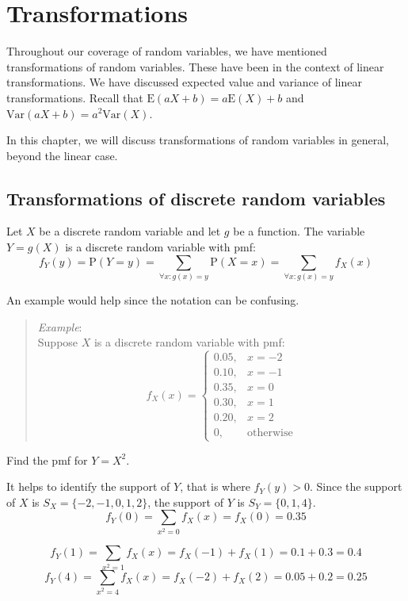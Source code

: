 \documentclass[
  letterpaper,
  DIV=11,
  numbers=noendperiod]{scrreprt}
\begin{document}
\section{Transformations}\label{transformations-1}

Throughout our coverage of random variables, we have mentioned
transformations of random variables. These have been in the context of
linear transformations. We have discussed expected value and variance of
linear transformations. Recall that \(\mbox{E}(aX+b)=a\mbox{E}(X)+b\)
and \(\mbox{Var}(aX+b)=a^2\mbox{Var}(X)\).

In this chapter, we will discuss transformations of random variables in
general, beyond the linear case.

\subsection{Transformations of discrete random
variables}\label{transformations-of-discrete-random-variables}

Let \(X\) be a discrete random variable and let \(g\) be a function. The
variable \(Y=g(X)\) is a discrete random variable with pmf: \[
f_Y(y)=\mbox{P}(Y=y)=\sum_{\forall x: g(x)=y}\mbox{P}(X=x)=\sum_{\forall x: g(x)=y}f_X(x)
\]

An example would help since the notation can be confusing.

\begin{quote}
\emph{Example}:\\
Suppose \(X\) is a discrete random variable with pmf: \[
f_X(x)=\left\{\begin{array}{ll} 0.05, & x=-2 \\ 
0.10, & x=-1 \\
0.35, & x=0 \\
0.30, & x=1 \\
0.20, & x=2 \\
0, & \mbox{otherwise} \end{array}\right.
\]
\end{quote}

Find the pmf for \(Y=X^2\).

It helps to identify the support of \(Y\), that is where \(f_{Y}(y)>0\).
Since the support of \(X\) is \(S_X=\{-2,-1,0,1,2\}\), the support of
\(Y\) is \(S_Y=\{0,1,4\}\). \[
f_Y(0)=\sum_{x^2=0}f_X(x)=f_X(0)=0.35
\]

\[
f_Y(1)=\sum_{x^2=1}f_X(x)=f_X(-1)+f_X(1)=0.1+0.3=0.4
\] \[
f_Y(4)=\sum_{x^2=4}f_X(x)=f_X(-2)+f_X(2)=0.05+0.2=0.25
\]
\end{document}
